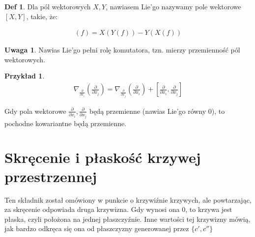 \documentclass{article}
\theoremstyle{plain}
\theoremstyle{definition}
\newtheorem*{defi*}{Def}
\newtheorem*{ex*}{Przykład}
\theoremstyle{definition}
\newtheorem*{not*}{Uwaga}
\begin{document}
\begin{defi*}
Dla pól wektorowych $X, Y$, nawiasem Lie'go nazywamy pole wektorowe $[X, Y]$, takie, że:

\begin{align*}
    [X, Y](f) = X(Y(f)) - Y(X(f))
\end{align*}

\end{defi*}

\begin{not*}
Nawias Lie'go pełni rolę komutatora, tzn. mierzy przemienność pól wektorowych.
\end{not*}

\begin{ex*}
\begin{align*}
    \nabla_{\frac{\partial}{\partial x_i}}(\frac{\partial}{\partial x_j}) = \nabla_{\frac{\partial}{\partial x_j}}(\frac{\partial}{\partial x_i}) + [\frac{\partial}{\partial x_i}, \frac{\partial}{\partial x_j}]
\end{align*}

\noindent Gdy pola wektorowe $\frac{\partial}{\partial x_i}, \frac{\partial}{\partial x_j}$ będą przemienne (nawias Lie'go równy 0), to pochodne kowariantne będą przemienne.

\end{ex*}

\section{Skręcenie i płaskość krzywej przestrzennej}
Ten składnik został omówiony w punkcie o krzywiźnie krzywych, ale powtarzając, za skręcenie odpowiada druga krzywizna. Gdy wynosi ona 0, to krzywa jest płaska, czyli położona na jednej płaszczyźnie. Inne wartości tej krzywizny mówią, jak bardzo odkręca się ona od płaszczyzny generowanej przez $\{c', c''\}$
\end{document}
